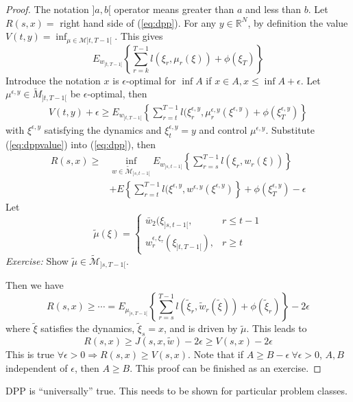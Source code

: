\begin{proof}
The notation $]a,b[$ operator means greater than $a$ and less than $b$. Let $R(s,x) = $ right hand side of (\ref{eq:dpp}). For any $y\in\mathbb{R}^N$, by definition the value $V(t,y) = \inf_{\mu\in\mathcal{M}]t,T-1[}$. This gives
$$E_{w_{]t,T-1[}}\left\lbrace \sum_{r=k}^{T-1}l(\xi_r,\mu_r(\xi))+\phi(\xi_T)\right\rbrace$$
Introduce the notation $x$ is $\epsilon$-optimal for $\inf A$ if $x\in A, x\leq\inf A+\epsilon$. Let $\mu^{\epsilon,y}\in\tilde{M}_{]t,T-1[}$ be $\epsilon$-optimal, then
\begin{align}
\label{eq:dppvalue}
V(t,y) + \epsilon\geq E_{w_{]t,T-1[}}\left\lbrace \sum_{r=t}^{T-1}l(\xi_r^{\epsilon,y}, \mu_r^{\epsilon,y}(\xi^{\epsilon,y}) + \phi(\xi_T^{\epsilon,y})\right\rbrace
\end{align}
with $\xi^{\epsilon,y}$ satisfying the dynamics and $\xi_t^{\epsilon,y} = y$ and control $\mu^{\epsilon,y}$. Substitute (\ref{eq:dppvalue}) into (\ref{eq:dpp}), then
\begin{align*}
R(s,x) \geq &\inf_{w\in\tilde{\mathcal{M}}_{]s,t-1[}} E_{w_{]s,t-1[}}\left\lbrace \sum_{r=s}^{T-1}l(\xi_r,w_r(\xi))\right\rbrace \\
&+ E\left\lbrace \sum_{r=t}^{T-1}l(\xi^{\epsilon,y},w^{\epsilon,y}(\xi^{\epsilon,y})\right\rbrace + \phi(\xi_T^{\epsilon,y}) - \epsilon
\end{align*}
Let
$$\tilde{\mu}(\xi) = \begin{cases} \bar{w}_2(\xi_{]s,t-1[}, & r\leq t-1 \\ w_r^{\epsilon,\xi_\tau}(\xi_{]t,T-1[}), & r\geq t \end{cases}$$
\textit{Exercise:} Show $\tilde{\mu}\in\tilde{\mathcal{M}}_{]s,T-1[}$.

Then we have
$$R(s,x) \geq \cdots = E_{\mu_{]s,T-1[}}\left\lbrace\sum_{r=s}^{T-1} l(\tilde{\xi}_r,\tilde{w}_r(\tilde{\xi})) + \phi(\tilde{\xi}_r)\right\rbrace - 2\epsilon$$
where $\tilde{\xi}$ satisfies the dynamics, $\tilde{\xi}_s=x$, and is driven by $\tilde{\mu}$. This leads to
$$R(s,x) \geq J(s,x,\tilde{w}) - 2\epsilon \geq V(s,x)-2\epsilon$$
This is true $\forall \epsilon>0\Rightarrow R(s,x)\geq V(s,x)$. Note that if $A\geq B-\epsilon ~\forall \epsilon > 0$, $A,B$ independent of $\epsilon$, then $A\geq B$. This proof can be finished as an exercise.
\end{proof}

DPP is ``universally'' true. This needs to be shown for particular problem classes.

